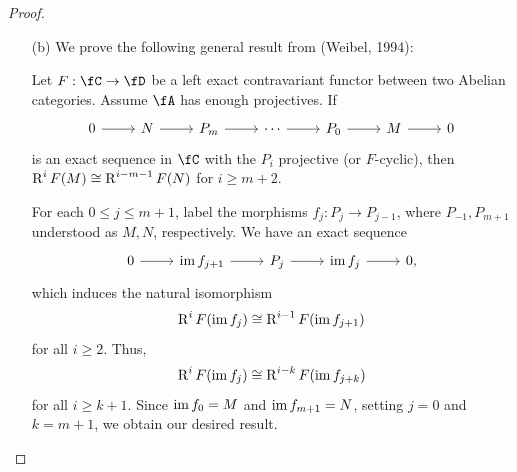 \documentclass[a4paper]{article}
\begin{document}
\begin{enumerate} [label=\textbf{\arabic*.}, leftmargin=0em]
\begin{proof}
\begin{itemize} [leftmargin=0cm]
                  Let $\pi : N' \to N$ be a surjective $A$-module homomorphism and $\phi : M \to N$ any $A$-module homomorphism.
                  There is a natural extension of $\phi$ to $A^{\oplus r}$ via taking the pull-back by the projection $A^{\oplus r} \to M$.
                  Any free module is projective, so there exists unique $A$-module homomorphism $h : A^{\oplus r} \to N'$ such that $\phi' = \pi \circ h$, so by restriction one has $\phi = \pi \circ \restr{h}{M}$.
                  Hence, $M$ is projective.
                  In particular, a module is projective if and only if it is a direct summand of a free module.

            \item[(b)] We prove the following general result from (Weibel, 1994):

                  \begin{lemma}
                    Let $F : \fC \to \fD$ be a left exact contravariant functor between two Abelian categories.
                    Assume $\fA$ has enough projectives.
                    If
                    \[ \begin{tikzcd}
                        0 \arrow[r] & N \arrow[r] & P_m \arrow[r] & \cdots \arrow[r] & P_0 \arrow[r] & M \arrow[r] & 0
                      \end{tikzcd} \]
                    is an exact sequence in $\fC$ with the $P_i$ projective (or $F$-cyclic), then $\operatorname{R}^iF(M) \cong \operatorname{R}^{i - m - 1} F(N)$ for $i \geq m + 2$.
                  \end{lemma}

                  For each $0 \leq j \leq m + 1$, label the morphisms $f_j : P_j \to P_{j - 1}$, where $P_{-1}, P_{m + 1}$ understood as $M, N$, respectively.
                  We have an exact sequence
                  \[ \begin{tikzcd}
                      0 \arrow[r] & \im{f_{j + 1}} \arrow[r] & P_{j} \arrow[r] & \im{f_{j}} \arrow[r] & 0,
                    \end{tikzcd} \]
                  which induces the natural isomorphism
                  \begin{equation*}
                    \operatorname{R}^i F(\operatorname{im}{f_{j}}) \cong \operatorname{R}^{i - 1} F(\operatorname{im}{f_{j + 1}})
                  \end{equation*}
                  for all $i \geq 2$.
                  Thus,
                  \begin{equation*}
                    \operatorname{R}^{i} F(\operatorname{im}{f_j}) \cong \operatorname{R}^{i - k} F(\operatorname{im}{f_{j + k}})
                  \end{equation*}
                  for all $i \geq k + 1$.
                  Since $\operatorname{im}{f_0} = M$ and $\operatorname{im}{f_{m + 1}} = N$, setting $j = 0$ and $k = m + 1$, we obtain our desired result.


\end{itemize}
\end{proof}
\end{enumerate}
\end{document}
